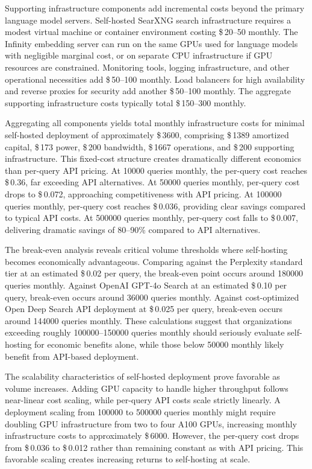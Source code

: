 Supporting infrastructure components add incremental costs beyond the primary language model servers. Self-hosted SearXNG search infrastructure requires a modest virtual machine or container environment costing \$\,\numrange{20}{50} monthly. The Infinity embedding server can run on the same GPUs used for language models with negligible marginal cost, or on separate CPU infrastructure if GPU resources are constrained. Monitoring tools, logging infrastructure, and other operational necessities add \$\,\numrange{50}{100} monthly. Load balancers for high availability and reverse proxies for security add another \$\,\numrange{50}{100} monthly. The aggregate supporting infrastructure costs typically total \$\,\numrange{150}{300} monthly.

Aggregating all components yields total monthly infrastructure costs for minimal self-hosted deployment of approximately \$\,\num{3600}, comprising \$\,\num{1389} amortized capital, \$\,\num{173} power, \$\,\num{200} bandwidth, \$\,\num{1667} operations, and \$\,\num{200} supporting infrastructure. This fixed-cost structure creates dramatically different economics than per-query API pricing. At \num{10000} queries monthly, the per-query cost reaches \$\,\num{0.36}, far exceeding API alternatives. At \num{50000} queries monthly, per-query cost drops to \$\,\num{0.072}, approaching competitiveness with API pricing. At \num{100000} queries monthly, per-query cost reaches \$\,\num{0.036}, providing clear savings compared to typical API costs. At \num{500000} queries monthly, per-query cost falls to \$\,\num{0.007}, delivering dramatic savings of 80--90\% compared to API alternatives.

The break-even analysis reveals critical volume thresholds where self-hosting becomes economically advantageous. Comparing against the Perplexity standard tier at an estimated \$\,\num{0.02} per query, the break-even point occurs around \num{180000} queries monthly. Against OpenAI GPT-4o Search at an estimated \$\,\num{0.10} per query, break-even occurs around \num{36000} queries monthly. Against cost-optimized Open Deep Search API deployment at \$\,\num{0.025} per query, break-even occurs around \num{144000} queries monthly. These calculations suggest that organizations exceeding roughly \numrange{100000}{150000} queries monthly should seriously evaluate self-hosting for economic benefits alone, while those below \num{50000} monthly likely benefit from API-based deployment.


The scalability characteristics of self-hosted deployment prove favorable as volume increases. Adding GPU capacity to handle higher throughput follows near-linear cost scaling, while per-query API costs scale strictly linearly. A deployment scaling from \num{100000} to \num{500000} queries monthly might require doubling GPU infrastructure from two to four A100 GPUs, increasing monthly infrastructure costs to approximately \$\,\num{6000}. However, the per-query cost drops from \$\,\num{0.036} to \$\,\num{0.012} rather than remaining constant as with API pricing. This favorable scaling creates increasing returns to self-hosting at scale.

